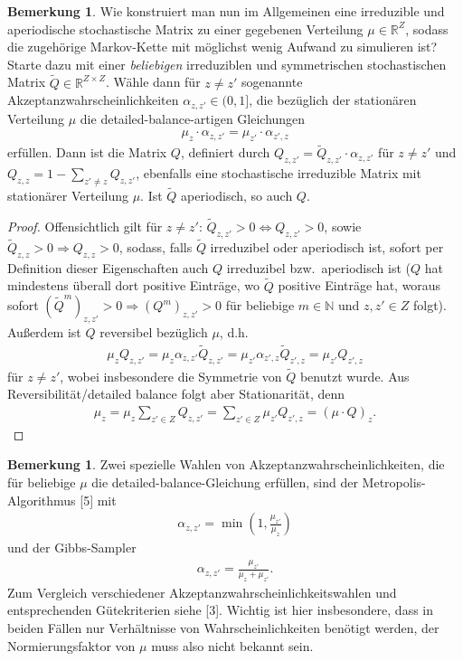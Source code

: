 \documentclass[twoside]{article}
\theoremstyle{definition}
\newtheorem{remark}[theorem]{Bemerkung}
\begin{document}
\begin{remark}
Wie konstruiert man nun im Allgemeinen eine irreduzible und aperiodische stochastische Matrix zu einer gegebenen Verteilung $\mu \in \mathbb{R}^Z$, sodass die zugehörige Markov-Kette mit möglichst wenig Aufwand zu simulieren ist? Starte dazu mit einer \textit{beliebigen} irreduziblen und symmetrischen stochastischen Matrix $\tilde{Q} \in \mathbb{R}^{Z \times Z}$. Wähle dann für $z \neq z'$ sogenannte Akzeptanzwahrscheinlichkeiten $\alpha_{z,z'} \in (0,1]$, die bezüglich der stationären Verteilung $\mu$ die detailed-balance-artigen Gleichungen
\begin{align}
\mu_z \cdot \alpha_{z,z'} = \mu_{z'} \cdot \alpha_{z',z}
\end{align}
erfüllen. Dann ist die Matrix $Q$, definiert durch $Q_{z,z'}=\tilde{Q}_{z,z'} \cdot \alpha_{z,z'}$ für $z \neq z'$ und $Q_{z,z} = 1 - \sum_{z' \neq z} Q_{z,z'}$, ebenfalls eine stochastische irreduzible Matrix mit stationärer Verteilung $\mu$. Ist $\tilde{Q}$ aperiodisch, so auch $Q$.
\end{remark}
\begin{proof}
Offensichtlich gilt für $z \neq z'$: $\tilde{Q}_{z,z'}>0 \Leftrightarrow Q_{z,z'}>0$, sowie $\tilde{Q}_{z,z} > 0 \Rightarrow Q_{z,z}>0$, sodass, falls $\tilde{Q}$ irreduzibel oder aperiodisch ist, sofort per Definition dieser Eigenschaften auch $Q$ irreduzibel bzw.\ aperiodisch ist ($Q$ hat mindestens überall dort positive Einträge, wo $\tilde{Q}$ positive Einträge hat, woraus sofort $(\tilde{Q}^m)_{z,z'}>0 \Rightarrow (Q^m)_{z,z'}>0$ für beliebige $m \in \mathbb{N}$ und $z,z' \in Z$ folgt). Außerdem ist $Q$ reversibel bezüglich $\mu$, d.h.\
\begin{align}
\mu_z Q_{z,z'} = \mu_z \alpha_{z,z'} \tilde{Q}_{z,z'} = \mu_{z'} \alpha_{z',z} \tilde{Q}_{z',z} = \mu_{z'} Q_{z',z}
\end{align}
für $z \neq z'$, wobei insbesondere die Symmetrie von $\tilde{Q}$ benutzt wurde. Aus Reversibilität/detailed balance folgt aber Stationarität, denn
\begin{align}
\mu_z = \mu_z \sum_{z' \in Z} Q_{z,z'} = \sum_{z'\in Z} \mu_{z'} Q_{z',z} = (\mu \cdot Q)_z.
\end{align}
\end{proof}
\begin{remark}
Zwei spezielle Wahlen von Akzeptanzwahrscheinlichkeiten, die für beliebige $\mu$ die detailed-balance-Gleichung erfüllen, sind der Metropolis-Algorithmus [5] mit
\begin{align}
\alpha_{z,z'} = \min\left(1,\frac{\mu_{z'}}{\mu_z}\right)
\end{align}
und der Gibbs-Sampler
\begin{align}
\alpha_{z,z'} = \frac{\mu_{z'}}{\mu_z+\mu_{z'}}.
\end{align}
Zum Vergleich verschiedener Akzeptanzwahrscheinlichkeitswahlen und entsprechenden Gütekriterien siehe [3]. Wichtig ist hier insbesondere, dass in beiden Fällen nur Verhältnisse von Wahrscheinlichkeiten benötigt werden, der Normierungsfaktor von $\mu$ muss also nicht bekannt sein.
\end{remark}
\end{document}
